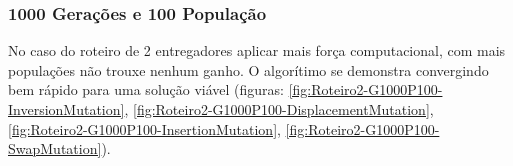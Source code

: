 \subsubsection{1000 Gerações e 100 População}

No caso do roteiro de 2 entregadores aplicar mais força computacional, com mais populações não trouxe nenhum ganho. O algorítimo se demonstra convergindo bem rápido para uma solução viável (figuras: \ref{fig:Roteiro2-G1000P100-InversionMutation},  \ref{fig:Roteiro2-G1000P100-DisplacementMutation},  \ref{fig:Roteiro2-G1000P100-InsertionMutation},  \ref{fig:Roteiro2-G1000P100-SwapMutation}).

\begin{center}
	\label{fig:Roteiro2-G1000P100-DisplacementMutation}
\end{center}

